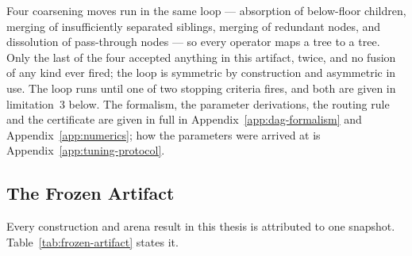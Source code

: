 Four coarsening moves run in the same loop --- absorption of
below-floor children, merging of insufficiently separated siblings,
merging of redundant nodes, and dissolution of pass-through nodes ---
so every operator maps a tree to a tree. Only the last of the four
accepted anything in this artifact, twice, and no fusion of any kind
ever fired; the loop is symmetric by construction and asymmetric in
use. The loop runs until one of two stopping criteria fires, and both
are given in limitation~3 below. The formalism, the parameter
derivations, the routing rule and the certificate are given in full in
Appendix~\ref{app:dag-formalism} and Appendix~\ref{app:numerics}; how
the parameters were arrived at is Appendix~\ref{app:tuning-protocol}.

\subsection{The Frozen Artifact}\label{sec:arch-frozen}

Every construction and arena result in this thesis is attributed to one
snapshot. Table~\ref{tab:frozen-artifact} states it.

